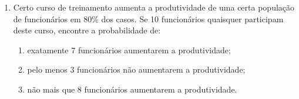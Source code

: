 \begin{enumerate}
\item Certo curso de treinamento aumenta a produtividade de uma certa população de funcionários em 80\% dos casos. Se 10 funcionários quaisquer participam deste curso, encontre a probabilidade de:
	\begin{enumerate}[label=\alph*)]
		\item exatamente 7 funcionários aumentarem a produtividade;
		\item pelo menos 3 funcionários não aumentarem a produtividade;
		\item não mais que 8 funcionários aumentarem a produtividade.
	\end{enumerate}
\end{enumerate}
